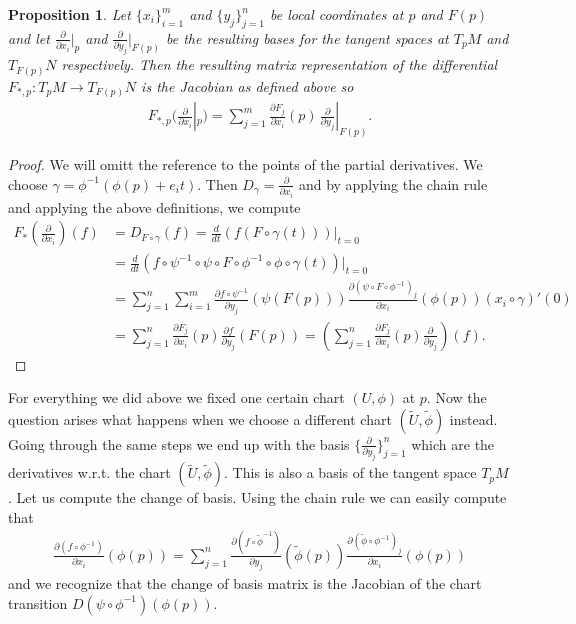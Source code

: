 \documentclass[12pt,a4paper]{article}
\numberwithin{equation}{subsection}
\numberwithin{lemma}{subsection}
\newtheorem{proposition}[lemma]{Proposition}
\theoremstyle{definition}
\begin{document}
\begin{proposition}
    Let $\{x_i\}_{i=1}^m$ and $\{y_j\}_{j=1}^n$ be local coordinates at 
    $p$ and $F(p)$ and let $\frac{\partial}{\partial x_i}|_p$ and 
    $\frac{\partial}{\partial y_j}|_{F(p)}$ be the resulting bases for the 
    tangent spaces at $T_p M$ and $T_{F(p)} N$ respectively. Then 
    the resulting matrix representation of the differential 
    $F_{*,p}:T_p M \rightarrow 
    T_{F(p)}N$ is the Jacobian as defined above so
    \begin{align*}
        F_{*,p} \bigg( \frac{\partial}{\partial x_i}|_p \bigg)
        = \sum_{j=1}^m \frac{\partial F_j}{\partial x_i}(p)\,
            \frac{\partial}{\partial y_j}|_{F(p)}. 
    \end{align*}
\end{proposition}
\begin{proof}
    We will omitt the reference to the points of the partial derivatives.
    We choose $\gamma = \phi^{-1}(\phi(p) + e_i t)$. Then 
    $D_\gamma = \frac{\partial}{\partial x_i}$ and by applying the chain 
    rule and applying the above definitions, we compute
    \begin{align*}
        F_{*}(\frac{\partial}{\partial x_i})(f)
        &= D_{F\circ \gamma}(f)
        = \frac{d}{dt} (f(F \circ \gamma(t) ) )|_{t=0} 
        \\ &= \frac{d}{dt} (f \circ \psi^{-1} \circ \psi   
            \circ F \circ \phi^{-1} \circ \phi \circ \gamma(t)  )|_{t=0}
        \\ &= \sum_{j=1}^n \sum_{i=1}^m \frac{\partial f \circ \psi^{-1}}{\partial y_j}
            (\psi(F(p)))  \frac{\partial (\psi \circ F \circ \phi^{-1})_j}{\partial x_i}
            (\phi(p))  (x_i \circ \gamma)'(0)
        \\ &= \sum_{j=1}^n \frac{\partial F_j}{\partial x_i}(p) 
            \frac{\partial f}{\partial y_j}(F(p))
        = \left( \sum_{j=1}^n \frac{\partial F_j}{\partial x_i}(p) 
            \frac{\partial}{\partial y_j} \right) (f).
    \end{align*} 
\end{proof}

For everything we did above we fixed one certain chart $(U,\phi)$ at $p$.
Now the question arises what happens when we choose a different chart 
$(\tilde{U}, \tilde{\phi})$ instead.
Going through the same steps we end up with the basis 
$\{ \frac{\partial}{\partial y_j} \}_{j=1}^n$ 
which are the derivatives w.r.t. the chart 
$(\tilde{U}, \tilde{\phi})$. This is also a basis of the tangent space $T_p M$. 
Let us compute the change of basis.
Using the chain rule 
we can easily compute that 
\begin{align*}
    \frac{\partial (f \circ \phi^{-1})}{\partial x_i} (\phi(p))
    =\sum_{j=1}^n \frac{\partial (f \circ \tilde{\phi}^{-1})}{\partial y_j} (\tilde{\phi}(p))
        \frac{\partial (\tilde{\phi} \circ \phi^{-1})_j}{\partial x_i}(\phi(p)) 
\end{align*}
and we recognize that the change of basis matrix is the Jacobian of 
the chart transition $D(\psi \circ \phi^{-1})(\phi(p))$.
\end{document}
